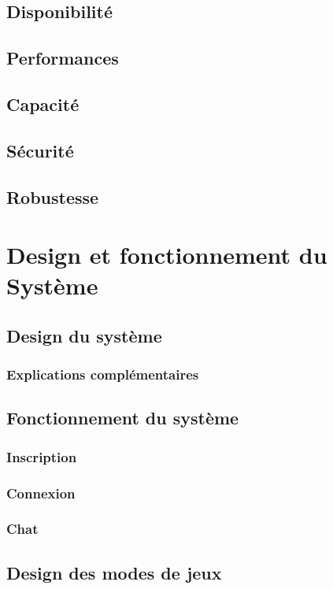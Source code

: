 \documentclass[utf8]{article}
\begin{document}
  \subsection{Disponibilité}
  \subsection{Performances}
  \subsection{Capacité}
  \subsection{Sécurité}
  \subsection{Robustesse}


\section{Design et fonctionnement du Système}
  \subsection{Design du système}
    \subsubsection{Explications complémentaires}
  \subsection{Fonctionnement du système}
    \subsubsection{Inscription}
    \subsubsection{Connexion}
    \subsubsection{Chat}
  \subsection{Design des modes de jeux}





\end{document}
